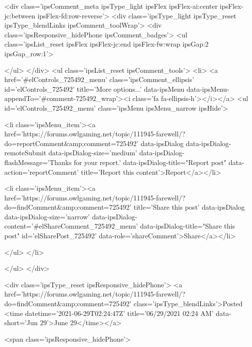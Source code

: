	<div class='ipsComment_meta ipsType_light ipsFlex ipsFlex-ai:center ipsFlex-jc:between ipsFlex-fd:row-reverse'>
		<div class='ipsType_light ipsType_reset ipsType_blendLinks ipsComment_toolWrap'>
			<div class='ipsResponsive_hidePhone ipsComment_badges'>
				<ul class='ipsList_reset ipsFlex ipsFlex-jc:end ipsFlex-fw:wrap ipsGap:2 ipsGap_row:1'>
					
					
					
					
					
				</ul>
			</div>
			<ul class='ipsList_reset ipsComment_tools'>
				<li>
					<a href='#elControls_725492_menu' class='ipsComment_ellipsis' id='elControls_725492' title='More options...' data-ipsMenu data-ipsMenu-appendTo='#comment-725492_wrap'><i class='fa fa-ellipsis-h'></i></a>
					<ul id='elControls_725492_menu' class='ipsMenu ipsMenu_narrow ipsHide'>
						
							<li class='ipsMenu_item'><a href='https://forums.owlgaming.net/topic/111945-farewell/?do=reportComment&amp;comment=725492' data-ipsDialog data-ipsDialog-remoteSubmit data-ipsDialog-size='medium' data-ipsDialog-flashMessage='Thanks for your report.' data-ipsDialog-title="Report post" data-action='reportComment' title='Report this content'>Report</a></li>
						
						
							<li class='ipsMenu_item'><a href='https://forums.owlgaming.net/topic/111945-farewell/?do=findComment&amp;comment=725492' title='Share this post' data-ipsDialog data-ipsDialog-size='narrow' data-ipsDialog-content='#elShareComment_725492_menu' data-ipsDialog-title="Share this post" id='elSharePost_725492' data-role='shareComment'>Share</a></li>
						
                        
						
						
						
							
								
							
							
							
							
							
							
						
					</ul>
				</li>
				
			</ul>
		</div>

		<div class='ipsType_reset ipsResponsive_hidePhone'>
			<a href='https://forums.owlgaming.net/topic/111945-farewell/?do=findComment&amp;comment=725492' class='ipsType_blendLinks'>Posted <time datetime='2021-06-29T02:24:47Z' title='06/29/2021 02:24  AM' data-short='Jun 29'>June 29</time></a> 
			
			<span class='ipsResponsive_hidePhone'>
				
